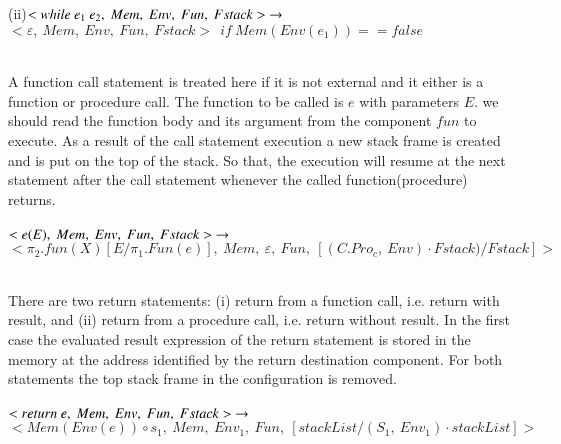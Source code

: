 \documentclass[letterpaper, 10 pt, conference]{IEEEtran}
\begin{document}
(ii)$<while~e_1~e_2,~Mem,~Env,~Fun,~Fstack>~\rightarrow\\ \\$
$<\varepsilon,~Mem,~Env,~Fun,~Fstack>~~if~Mem(Env(e_1))==false$\\ \\
\par A function call statement is treated here if it is not external and it either is a function or
procedure call. The function to be called is $e$ with parameters $E$. we should read the function body and its argument from the component $fun$ to execute. As a result of the
call statement execution a new stack frame is created and is put on the top of the stack. So
that, the execution will resume at the next statement after the call statement whenever
the called function(procedure) returns. \\ \\
$<e(E),~Mem,~Env,~Fun,~Fstack>~\rightarrow\\ \\$
$<\pi_{2}.fun(X)[E/\pi_1.Fun(e)],~Mem,~\varepsilon,~Fun,~[(C.Pro_c,~Env)\cdot Fstack)/Fstack]>$\\ \\
\par There are two return statements: (i) return from a function call, i.e. return
with result, and (ii) return from a procedure call, i.e. return without result. In the first
case the evaluated result expression of the return statement is stored in the memory
at the address identified by the return destination component. For both statements the top stack frame in the configuration is removed. \\ \\
$<return~e,~Mem,~Env,~Fun,~Fstack>~\rightarrow\\ \\$
$<Mem(Env(e))\circ s_1,~Mem,~Env_1,~Fun,~[stackList/(S_1,~Env_1)\cdot stackList]>$\\ \\
\end{document}
